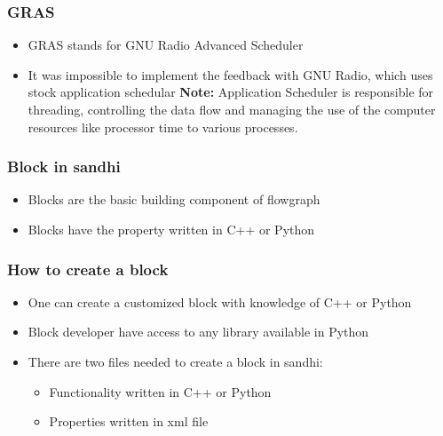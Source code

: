 \documentclass{beamer}
\begin{document}
\begin{frame}
        \frametitle{GRAS}
        \begin{itemize}
		\item GRAS stands for GNU Radio Advanced Scheduler
		\item It was impossible to implement the feedback with GNU Radio, which uses stock application schedular 
\textbf{Note:} Application Scheduler is responsible for threading, controlling the data flow and managing the use of the computer resources like processor time to various processes.
        \end{itemize}
\end{frame}

\begin{frame}
        \frametitle{Block in sandhi}
        \begin{itemize}
	\item Blocks are the basic building component of flowgraph
	\item Blocks have the property written in C++ or Python
        \end{itemize}
\end{frame}

\begin{frame}
        \frametitle{How to create a block}
        \begin{itemize}
        \item One can create a customized block with knowledge of C++ or Python
        \item Block developer have access to any library available in Python
	\item There are two files needed to create a block in sandhi:
		\begin{itemize}
			\item Functionality written in C++ or Python
			\item Properties written in xml file
		\end{itemize}
        \end{itemize}
\end{frame}
\end{document}
